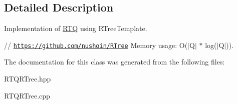 \subsection{\-Detailed \-Description}
\-Implementation of \hyperlink{class_r_t_q}{\-R\-T\-Q} using \-R\-Tree\-Template. 

// \href{https://github.com/nushoin/RTree}{\tt https\-://github.\-com/nushoin/\-R\-Tree} \-Memory usage\-: \-O($|$\-Q$|$ $\ast$ log($|$\-Q$|$)). 

\-The documentation for this class was generated from the following files\-:\begin{DoxyCompactItemize}
\item 
\-R\-T\-Q\-R\-Tree.\-hpp\item 
\-R\-T\-Q\-R\-Tree.\-cpp\end{DoxyCompactItemize}
